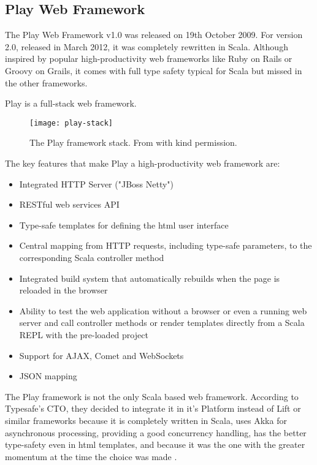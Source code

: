 \subsection{Play Web Framework}


The Play Web Framework v1.0 was released on 19th October 2009. For version 2.0, released in March 2012, it was completely rewritten in Scala.
Although inspired by popular high-productivity web frameworks like Ruby on Rails or Groovy on Grails, it comes with full type safety typical for Scala but missed in the other frameworks.

Play is a full-stack web framework.

\begin{figure}[H]
\centering
\texttt{[image: play-stack]}
\caption{The Play framework stack. From \cite{play-book} with kind permission.}
\end{figure}

The key features that make Play a high-productivity web framework are:
 
\begin{itemize}
\item Integrated HTTP Server ("JBoss Netty")
\item RESTful web services API 
\item Type-safe templates for defining the html user interface
\item Central mapping from HTTP requests, including type-safe parameters, to the corresponding Scala controller method
\item Integrated build system that automatically rebuilds when the page is reloaded in the browser
\item Ability to test the web application without a browser or even a running web server and call controller methods or render templates directly from a Scala REPL with the pre-loaded project 
\item Support for AJAX, Comet and WebSockets
\item JSON mapping
\end{itemize}

The Play framework is not the only Scala based web framework. According to Typesafe's CTO, they decided to integrate it in it's Platform instead of Lift or similar frameworks because it is completely written in Scala, uses Akka for asynchronous processing, providing a good concurrency handling, has the better type-safety even in html templates, and because it was the one with the greater momentum at the time the choice was made \cite[cf.][]{playdecision}.
